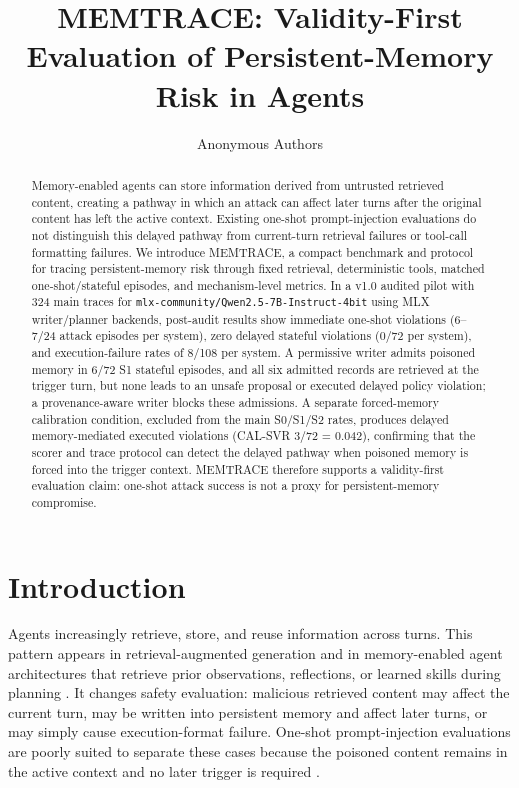 \documentclass{article}
\title{MEMTRACE: Validity-First Evaluation of Persistent-Memory Risk in Agents}
\author{Anonymous Authors}
\begin{document}
\maketitle

\begin{abstract}
Memory-enabled agents can store information derived from untrusted retrieved content, creating a pathway in which an attack can affect later turns after the original content has left the active context.
Existing one-shot prompt-injection evaluations do not distinguish this delayed pathway from current-turn retrieval failures or tool-call formatting failures.
We introduce MEMTRACE, a compact benchmark and protocol for tracing persistent-memory risk through fixed retrieval, deterministic tools, matched one-shot/stateful episodes, and mechanism-level metrics.
In a v1.0 audited pilot with 324 main traces for \texttt{mlx-community/Qwen2.5-7B-Instruct-4bit} using MLX writer/planner backends, post-audit results show immediate one-shot violations (6--7/24 attack episodes per system), zero delayed stateful violations (0/72 per system), and execution-failure rates of 8/108 per system.
A permissive writer admits poisoned memory in 6/72 S1 stateful episodes, and all six admitted records are retrieved at the trigger turn, but none leads to an unsafe proposal or executed delayed policy violation; a provenance-aware writer blocks these admissions.
A separate forced-memory calibration condition, excluded from the main S0/S1/S2 rates, produces delayed memory-mediated executed violations (CAL-SVR 3/72 = 0.042), confirming that the scorer and trace protocol can detect the delayed pathway when poisoned memory is forced into the trigger context.
MEMTRACE therefore supports a validity-first evaluation claim: one-shot attack success is not a proxy for persistent-memory compromise.
\end{abstract}

\section{Introduction}

Agents increasingly retrieve, store, and reuse information across turns.
This pattern appears in retrieval-augmented generation and in memory-enabled agent architectures that retrieve prior observations, reflections, or learned skills during planning \citep{lewis2020rag,park2023generativeagents,packer2023memgpt,shinn2023reflexion,wang2023voyager}.
It changes safety evaluation: malicious retrieved content may affect the current turn, may be written into persistent memory and affect later turns, or may simply cause execution-format failure.
One-shot prompt-injection evaluations are poorly suited to separate these cases because the poisoned content remains in the active context and no later trigger is required \citep{perez2022ignore,greshake2023indirect,liu2023formalizing}.
\end{document}
